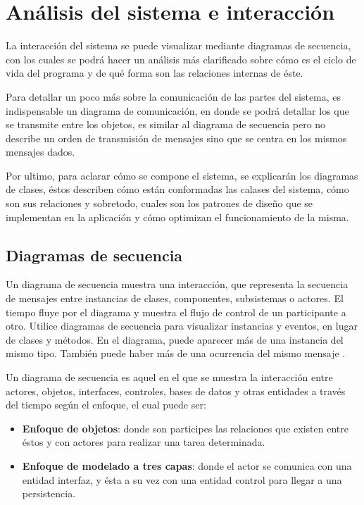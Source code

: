 \chapter{Análisis del sistema e interacción}

La interacción del sistema se puede visualizar mediante diagramas de secuencia, con los cuales se podrá hacer un análisis más clarificado sobre cómo es el ciclo de vida del programa y de qué forma son las relaciones internas de éste.

Para detallar un poco más sobre la comunicación de las partes del sistema, es indispensable un diagrama de comunicación, en donde se podrá detallar los que se transmite entre los objetos, es similar al diagrama de secuencia pero no describe un orden de transmisión de mensajes sino que se centra en los mismos mensajes dados.

Por ultimo, para aclarar cómo se compone el sistema, se explicarán los diagramas de clases, éstos describen cómo están conformadas las calases del sistema, cómo son sus relaciones y sobretodo, cuales son los patrones de diseño que se implementan en la aplicación y cómo optimizan el  funcionamiento de la misma.

\section{Diagramas de secuencia}

Un diagrama de secuencia muestra una interacción, que representa la secuencia de mensajes entre instancias de clases, componentes, subsistemas o actores. El tiempo fluye por el diagrama y muestra el flujo de control de un participante a otro. Utilice diagramas de secuencia para visualizar instancias y eventos, en lugar de clases y métodos. En el diagrama, puede aparecer más de una instancia del mismo tipo. También puede haber más de una ocurrencia del mismo mensaje \cite{Pw3DS}.

Un diagrama de secuencia es aquel en el que se muestra la interacción entre actores, objetos, interfaces, controles, bases de datos y otras entidades a través del tiempo según el enfoque, el cual puede ser:
\begin{itemize}
	\item \textbf{Enfoque de objetos}: donde son participes las relaciones que existen entre éstos y con actores para realizar una tarea determinada.
	\item \textbf{Enfoque de modelado a tres capas}: donde el actor se comunica con una entidad interfaz, y ésta a su vez con una entidad control para llegar a una persistencia. 
\end{itemize}

